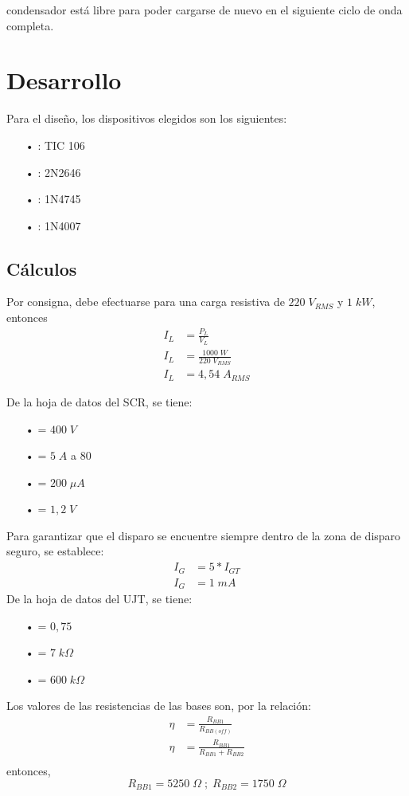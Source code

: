 \documentclass{article}
\begin{document}
condensador está libre para poder cargarse de nuevo en el siguiente ciclo de onda completa. 
%
\section{Desarrollo}
Para el diseño, los dispositivos elegidos son los siguientes:
\begin{itemize}\itemsep0em \itemindent=2em
	\item[•]{: TIC 106}
	\item[•]{: 2N2646}
	\item[•]{: 1N4745}
	\item[•]{: 1N4007}
\end{itemize}
%
\subsection{Cálculos}
Por consigna, debe efectuarse para una carga resistiva de $220\;V_{RMS}$ y $1\;kW$, entonces
\begin{align*}
	I_L &= \frac{P_L}{V_L} \\
	I_L	&= \frac{1000\;W}{220\;V_{RMS}} \\
	I_L	&= 4,54 \; A_{RMS}
\end{align*}

De la hoja de datos del SCR, se tiene:
%
\begin{itemize}\itemsep0em \itemindent=2em
	\item[•]{= $400 \; V$}
	\item[•]{= $5 \; A$ a 80}
	\item[•]{= $200 \; \mu A$}
	\item[•]{= $1,2 \; V$}
\end{itemize}
Para garantizar que el disparo se encuentre siempre dentro de la zona de disparo seguro, se establece:
\begin{align*}
	I_G &= 5 * I_{GT} \\
	I_G	&= 1 \; mA
\end{align*}
%
De la hoja de datos del UJT, se tiene:
\begin{itemize}\itemsep0em \itemindent=2em
	\item[•]{\makebox[1.8cm]{$\eta$\hfill}= $0,75$}
	\item[•]{= $7 \; k\Omega$}
	\item[•]{= $600 \; k\Omega$}
\end{itemize}
%
Los valores de las resistencias de las bases son, por la relación:
\begin{align*}
	\eta &= \frac{R_{BB1}}{R_{BB(off)}} \\
	\eta &= \frac{R_{BB1}}{R_{BB1} + R_{BB2}}\\
\end{align*}
entonces, 
\[R_{BB1} = 5250 \; \Omega \; ; \; R_{BB2} = 1750 \; \Omega \]
\clearpage
%
\end{document}
